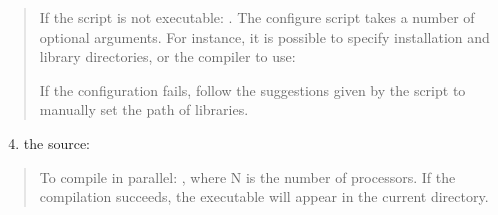 \documentclass[letterpaper,10pt,english]{sphinxmanual}
\begin{document}
\begin{quote}

If the script is not executable: .
The configure script takes a number of optional arguments. For instance, it is possible to specify installation and library directories, or the compiler to use:

\begin{sphinxVerbatim}[commandchars=\\\{\}]
     
\end{sphinxVerbatim}

If the configuration fails, follow the suggestions given by the script to manually set the path of libraries.
\end{quote}
\begin{enumerate}
\setcounter{enumi}{3}
\item {} 
 the source:

\begin{sphinxVerbatim}[commandchars=\\\{\}]
 
\end{sphinxVerbatim}

\end{enumerate}
\begin{quote}

To compile in parallel: , where N is the number of processors. If the compilation   succeeds, the executable  will appear in the current directory.
\end{quote}
\end{document}
